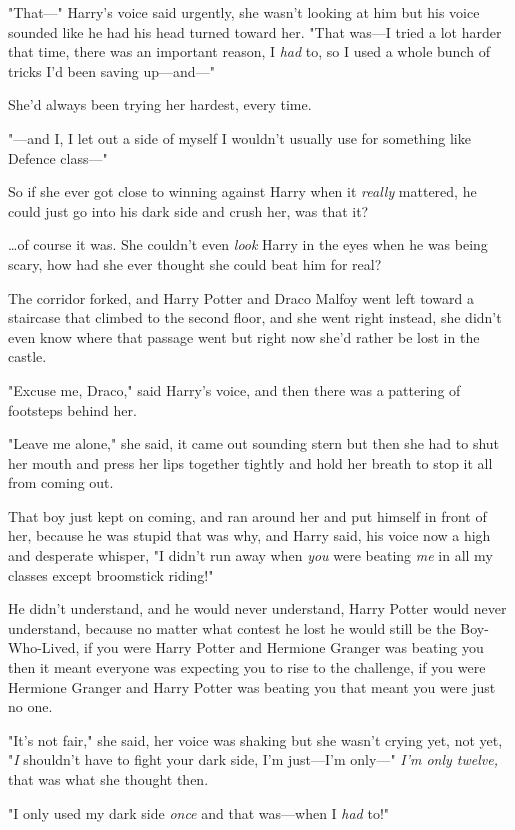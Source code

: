 "That---" Harry's voice said urgently, she wasn't looking at him but his voice
sounded like he had his head turned toward her. "That was---I tried a lot
harder that time, there was an important reason, I \emph{had} to, so I used a
whole bunch of tricks I'd been saving up---and---"

She'd always been trying her hardest, every time.

"---and I, I let out a side of myself I wouldn't usually use for something like
Defence class---"

So if she ever got close to winning against Harry when it \emph{really}
mattered, he could just go into his dark side and crush her, was that it?

{\ldots}of course it was. She couldn't even \emph{look} Harry in the eyes when
he was being scary, how had she ever thought she could beat him for real?

The corridor forked, and Harry Potter and Draco Malfoy went left toward a
staircase that climbed to the second floor, and she went right instead, she
didn't even know where that passage went but right now she'd rather be lost in
the castle.

"Excuse me, Draco," said Harry's voice, and then there was a pattering of
footsteps behind her.

"Leave me alone," she said, it came out sounding stern but then she had to shut
her mouth and press her lips together tightly and hold her breath to stop it
all from coming out.

That boy just kept on coming, and ran around her and put himself in front of
her, because he was stupid that was why, and Harry said, his voice now a high
and desperate whisper, "I didn't run away when \emph{you} were beating
\emph{me} in all my classes except broomstick riding!"

He didn't understand, and he would never understand, Harry Potter would never
understand, because no matter what contest he lost he would still be the
Boy-Who-Lived, if you were Harry Potter and Hermione Granger was beating you
then it meant everyone was expecting you to rise to the challenge, if you were
Hermione Granger and Harry Potter was beating you that meant you were just no
one.

"It's not fair," she said, her voice was shaking but she wasn't crying yet, not
yet, "\emph{I} shouldn't have to fight your dark side, I'm just---I'm only---"
\emph{I'm only twelve,} that was what she thought then.

"I only used my dark side \emph{once} and that was---when I \emph{had} to!"

